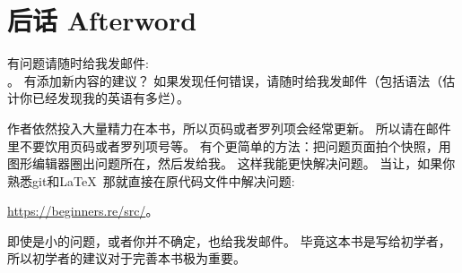 \documentclass[UTF8,nofonts]{ctexart}
\begin{document}

\part*{后话 Afterword}


有问题请随时给我发邮件: \\
\GTT{\EMAILS}。
有添加新内容的建议？
如果发现任何错误，请随时给我发邮件（包括语法（估计你已经发现我的英语有多烂）。

作者依然投入大量精力在本书，所以页码或者罗列项会经常更新。
所以请在邮件里不要饮用页码或者罗列项号等。
有个更简单的方法：把问题页面拍个快照，用图形编辑器圈出问题所在，然后发给我。
这样我能更快解决问题。
当让，如果你熟悉git和\LaTeX\, 那就直接在原代码文件中解决问题: 

\url{https://beginners.re/src/}。

即使是小的问题，或者你并不确定，也给我发邮件。
毕竟这本书是写给初学者，所以初学者的建议对于完善本书极为重要。
\end{document}
